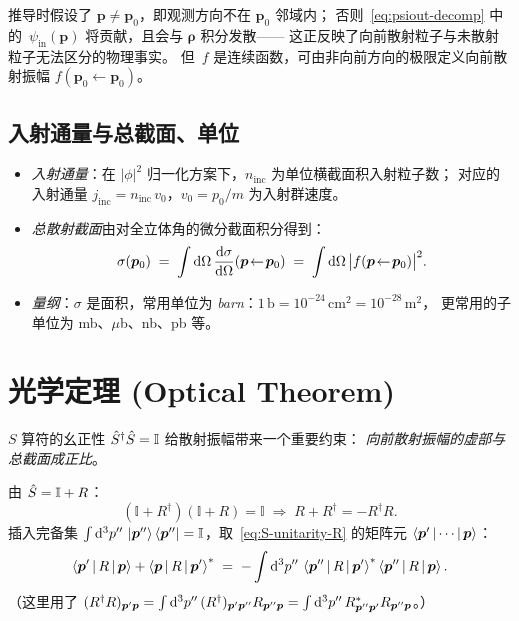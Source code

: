 \begin{remark}[向前方向被排除]
推导时假设了 $\bm{p}\neq\bm{p}_0$，即观测方向不在 $\bm{p}_0$ 邻域内；
否则~\eqref{eq:psiout-decomp} 中的~$\psi_{\text{in}}(\bm{p})$ 将贡献，且会与 $\bm{\rho}$ 积分发散——
这正反映了向前散射粒子与未散射粒子无法区分的物理事实。
但~$f$ 是连续函数，可由非向前方向的极限定义向前散射振幅 $f(\bm{p}_0\!\leftarrow\!\bm{p}_0)$。
\end{remark}

\subsection{入射通量与总截面、单位}

\begin{itemize}
\item \emph{入射通量}：在 $|\phi|^2$ 归一化方案下，$n_{\text{inc}}$ 为单位横截面积入射粒子数；
对应的入射通量 $j_{\text{inc}} = n_{\text{inc}}\,v_0$，$v_0 = p_0/m$ 为入射群速度。
\item \emph{总散射截面}由对全立体角的微分截面积分得到：
\begin{equation}
\sigma(\bm{p}_0) \;=\; \int \mathrm{d}\Omega\,\frac{\mathrm{d}\sigma}{\mathrm{d}\Omega}(\bm{p}\!\leftarrow\!\bm{p}_0)
\;=\; \int \mathrm{d}\Omega\,\big|f(\bm{p}\!\leftarrow\!\bm{p}_0)\big|^2.
\label{eq:sigma-total}
\end{equation}
\item \emph{量纲}：$\sigma$ 是面积，常用单位为
\emph{barn}：$1\,\text{b} = 10^{-24}\,\text{cm}^2 = 10^{-28}\,\text{m}^2$，
更常用的子单位为 mb、$\mu$b、nb、pb 等。
\end{itemize}

\section{光学定理 (Optical Theorem)}

$S$ 算符的幺正性 $\hat{S}^\dagger \hat{S} = \mathbb{I}$ 给散射振幅带来一个重要约束：
\emph{向前散射振幅的虚部与总截面成正比}。

由 $\hat{S} = \mathbb{I} + R$：
\begin{equation}
(\mathbb{I} + R^\dagger)(\mathbb{I} + R) = \mathbb{I} \;\Longrightarrow\; R + R^\dagger = -R^\dagger R.
\label{eq:S-unitarity-R}
\end{equation}
插入完备集 $\int \mathrm{d}^3 p''\,\ket{\bm{p}''}\bra{\bm{p}''} = \mathbb{I}$，取~\eqref{eq:S-unitarity-R} 的矩阵元
$\left\langle \bm{p}' \,\middle|\, \cdots \,\middle|\, \bm{p} \right\rangle$：
\begin{equation}
\left\langle \bm{p}' \,\middle|\, R \,\middle|\, \bm{p} \right\rangle + \left\langle \bm{p} \,\middle|\, R \,\middle|\, \bm{p}' \right\rangle^*
\;=\; -\int \mathrm{d}^3 p''\,\left\langle \bm{p}'' \,\middle|\, R \,\middle|\, \bm{p}' \right\rangle^*\left\langle \bm{p}'' \,\middle|\, R \,\middle|\, \bm{p} \right\rangle.
\label{eq:R-unitarity-matrix}
\end{equation}
（这里用了 $(R^\dagger R)_{\bm{p}'\bm{p}} = \int \mathrm{d}^3 p''\,(R^\dagger)_{\bm{p}'\bm{p}''}R_{\bm{p}''\bm{p}}
= \int \mathrm{d}^3 p''\,R^*_{\bm{p}''\bm{p}'}R_{\bm{p}''\bm{p}}$。）

